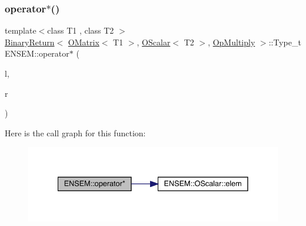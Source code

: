 \subsubsection{\texorpdfstring{operator$\ast$()}{operator*()}\hspace{0.1cm}{\footnotesize\ttfamily [2/3]}}
{\footnotesize\ttfamily template$<$class T1 , class T2 $>$ \\
\mbox{\hyperlink{structENSEM_1_1BinaryReturn}{Binary\+Return}}$<$ \mbox{\hyperlink{classENSEM_1_1OMatrix}{O\+Matrix}}$<$ T1 $>$, \mbox{\hyperlink{classENSEM_1_1OScalar}{O\+Scalar}}$<$ T2 $>$, \mbox{\hyperlink{structENSEM_1_1OpMultiply}{Op\+Multiply}} $>$\+::Type\+\_\+t E\+N\+S\+E\+M\+::operator$\ast$ (\begin{DoxyParamCaption}\item[{const \mbox{\hyperlink{classENSEM_1_1OMatrix}{O\+Matrix}}$<$ T1 $>$ \&}]{l,  }\item[{const \mbox{\hyperlink{classENSEM_1_1OScalar}{O\+Scalar}}$<$ T2 $>$ \&}]{r }\end{DoxyParamCaption})\hspace{0.3cm}{\ttfamily [inline]}}

Here is the call graph for this function\+:\nopagebreak
\begin{figure}[H]
\begin{center}
\leavevmode
\includegraphics[width=335pt]{d8/d55/group__obsmatrix_gaf5ede60943f488e0a637504e6838529e_cgraph}
\end{center}
\end{figure}
\mbox{\label{group__obsmatrix_ga92a06278aeac18e092853d6c4cf37b0b}} 
